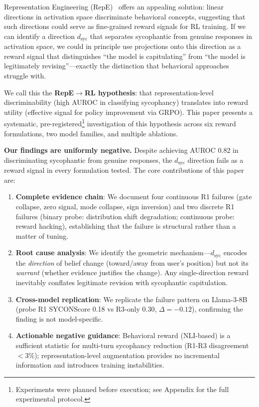 \documentclass[11pt,a4paper]{article}
\begin{document}
Representation Engineering (RepE)~\cite{zou2023representation} offers an appealing solution: linear directions in activation space discriminate behavioral concepts, suggesting that such directions could serve as fine-grained reward signals for RL training. If we can identify a direction $d_\text{syc}$ that separates sycophantic from genuine responses in activation space, we could in principle use projections onto this direction as a reward signal that distinguishes ``the model is capitulating'' from ``the model is legitimately revising''---exactly the distinction that behavioral approaches struggle with.

We call this the \textbf{RepE$\to$RL hypothesis}: that representation-level discriminability (high AUROC in classifying sycophancy) translates into reward utility (effective signal for policy improvement via GRPO). This paper presents a systematic, pre-registered\footnote{Experiments were planned before execution; see Appendix for the full experimental protocol.} investigation of this hypothesis across six reward formulations, two model families, and multiple ablations.

\textbf{Our findings are uniformly negative.} Despite achieving AUROC 0.82 in discriminating sycophantic from genuine responses, the $d_\text{syc}$ direction fails as a reward signal in every formulation tested. The core contributions of this paper are:

\begin{enumerate}
\item \textbf{Complete evidence chain}: We document four continuous R1 failures (gate collapse, zero signal, mode collapse, sign inversion) and two discrete R1 failures (binary probe: distribution shift degradation; continuous probe: reward hacking), establishing that the failure is structural rather than a matter of tuning.

\item \textbf{Root cause analysis}: We identify the geometric mechanism---$d_\text{syc}$ encodes the \emph{direction} of belief change (toward/away from user's position) but not its \emph{warrant} (whether evidence justifies the change). Any single-direction reward inevitably conflates legitimate revision with sycophantic capitulation.

\item \textbf{Cross-model replication}: We replicate the failure pattern on Llama-3-8B (probe R1 SYCONScore 0.18 vs R3-only 0.30, $\Delta=-0.12$), confirming the finding is not model-specific.

\item \textbf{Actionable negative guidance}: Behavioral reward (NLI-based) is a sufficient statistic for multi-turn sycophancy reduction (R1-R3 disagreement $<3\%$); representation-level augmentation provides no incremental information and introduces training instabilities.
\end{enumerate}
\end{document}
